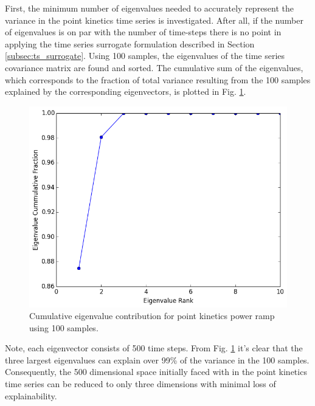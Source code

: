 First, the minimum number of eigenvalues needed to accurately represent the variance in the point kinetics time series is investigated. After all, if the number of eigenvalues is on par with the number of time-steps there is no point in applying the time series surrogate formulation described in Section \ref{subsec:ts_surrogate}. Using 100 samples, the eigenvalues of the time series covariance matrix are found and sorted. The cumulative sum of the eigenvalues, which corresponds to the fraction of total variance resulting from the 100 samples explained by the corresponding eigenvectors, is plotted in Fig. \ref{fig:pk_eigenvalues}.    
\begin{figure}[!h]
\caption{\label{fig:pk_eigenvalues}
Cumulative eigenvalue contribution for point kinetics power ramp using 100 samples.}
 \begin{center}
  \includegraphics[scale=.75]{./Chapter4/pk_eigenvalues.png}
 \end{center}
\end{figure}
Note, each eigenvector consists of 500 time steps. From Fig. \ref{fig:pk_eigenvalues} it's clear that the three largest eigenvalues can explain over 99\% of the variance in the 100 samples. Consequently, the 500 dimensional space initially faced with in the point kinetics time series can be reduced to only three dimensions with minimal loss of explainability. 

